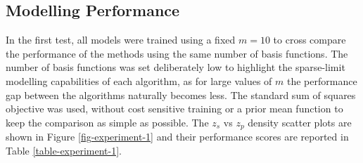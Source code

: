 \documentclass[useAMS,usenatbib,fleqn]{mn2e}
\begin{document}
\subsection{Modelling Performance}

In the first test, all models were trained using a fixed $m=10$ to cross compare the performance of the methods using the same number of basis functions. The number of basis functions was set deliberately low to highlight the sparse-limit modelling capabilities of each algorithm, as for large values of $m$ the performance gap between the algorithms naturally becomes less. The standard sum of squares objective was used, without cost sensitive training or a prior mean function to keep the comparison as simple as possible. The $z_{s}$ vs $z_{p}$ density scatter plots are shown in Figure \ref{fig-experiment-1} and their performance scores are reported in Table \ref{table-experiment-1}.
\end{document}
